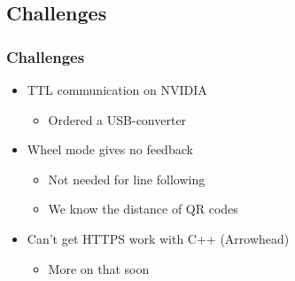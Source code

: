 \subsection{Challenges}
\begin{frame}
    \frametitle{Challenges}

    \begin{itemize}
        \item TTL communication on NVIDIA
        \begin{itemize}
            \item Ordered a USB-converter
        \end{itemize}
        \item Wheel mode gives no feedback
        \begin{itemize}
            \item Not needed for line following
            \item We know the distance of QR codes
        \end{itemize}
        \item Can't get HTTPS work with C++ (Arrowhead)
        \begin{itemize}
            \item More on that soon
        \end{itemize}
    \end{itemize}
\end{frame}